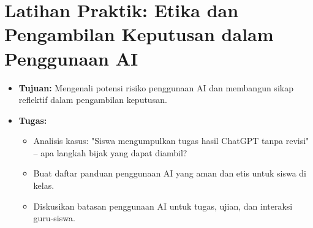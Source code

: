 \section*{Latihan Praktik: Etika dan Pengambilan Keputusan dalam Penggunaan AI}
\begin{itemize}
	\item \textbf{Tujuan:} Mengenali potensi risiko penggunaan AI dan membangun sikap reflektif dalam pengambilan keputusan.
	\item \textbf{Tugas:}
	\begin{itemize}
		\item Analisis kasus: "Siswa mengumpulkan tugas hasil ChatGPT tanpa revisi" – apa langkah bijak yang dapat diambil?
		\item Buat daftar panduan penggunaan AI yang aman dan etis untuk siswa di kelas.
		\item Diskusikan batasan penggunaan AI untuk tugas, ujian, dan interaksi guru-siswa.
	\end{itemize}
\end{itemize}
